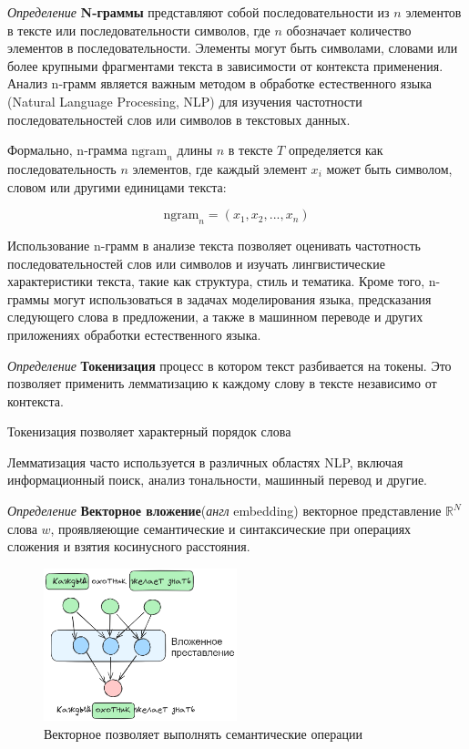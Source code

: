 \textit{Определение} \textbf{N-граммы} представляют собой последовательности из \( n \) элементов в тексте или последовательности символов, где \( n \) обозначает количество элементов в последовательности. Элементы могут быть символами, словами или более крупными фрагментами текста в зависимости от контекста применения. Анализ n-грамм является важным методом в обработке естественного языка (Natural Language Processing, NLP) для изучения частотности последовательностей слов или символов в текстовых данных.

Формально, n-грамма \( \text{ngram}_n \) длины \( n \) в тексте \( T \) определяется как последовательность \( n \) элементов, где каждый элемент \( x_i \) может быть символом, словом или другими единицами текста:

\[ \text{ngram}_n = (x_1, x_2, ..., x_n) \]

Использование n-грамм в анализе текста позволяет оценивать частотность последовательностей слов или символов и изучать лингвистические характеристики текста, такие как структура, стиль и тематика. Кроме того, n-граммы могут использоваться в задачах моделирования языка, предсказания следующего слова в предложении, а также в машинном переводе и других приложениях обработки естественного языка.

\textit{Определение} \textbf{Токенизация} процесс в котором текст разбивается на токены. 
Это позволяет применить лемматизацию к каждому слову в тексте независимо от контекста.

Токенизация позволяет характерный порядок слова

 Лемматизация часто используется в различных областях NLP, включая информационный поиск, анализ тональности, машинный перевод и другие.

\textit{Определение } \textbf{Векторное вложение}(\textit{англ} embedding) векторное представление $\mathbb{R}^N$ слова $w$,
проявляеющие семантические и синтаксические при операциях сложения и взятия косинусного расстояния.

\begin{figure}[h]
    \centering
    \includegraphics[width=0.5\textwidth]{assets/ml/nlp/word2vec.excalidraw.png}
    \caption{Векторное позволяет выполнять семантические операции}
    \label{embedding}
\end{figure}

